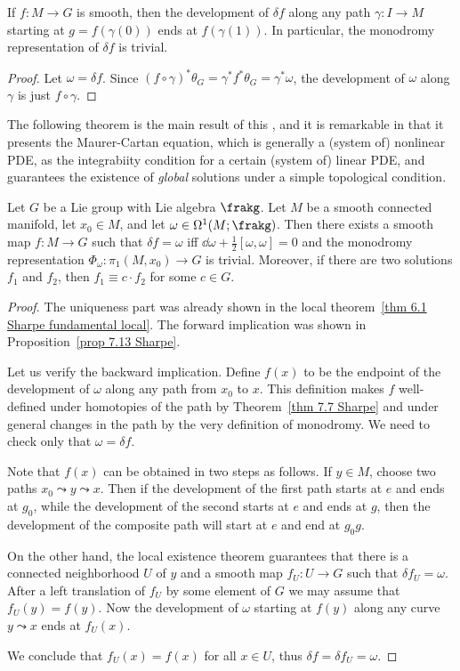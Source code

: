 \begin{prop}\label{prop 7.13 Sharpe}
    If $f:M\to G$ is smooth, then the development of $\delta f$ along any path $\gamma:I\to M$ starting at $g=f(\gamma(0))$ ends at $f(\gamma(1))$. In particular, the monodromy representation of $\delta f$ is trivial.
\end{prop}
\begin{proof}
    Let $\omega=\delta f$. Since $(f\circ \gamma)^\ast \theta_G=\gamma^\ast f^\ast\theta_G=\gamma^\ast\omega$, the development of $\omega$ along $\gamma$ is just $f\circ\gamma$.
\end{proof}

The following theorem is the main result of this \sect, and it is remarkable in that it presents the Maurer-Cartan equation, which is generally a (system of) nonlinear PDE, as the integrabiity condition for a certain (system of) linear PDE, and guarantees the existence of \emph{global} solutions under a simple topological condition.

\begin{thm}\label{thm 7.14 Sharpe fundamental global}
    Let $G$ be a Lie group with Lie algebra $\frakg$. Let $M$ be a smooth connected manifold, let $x_0\in M$, and let $\omega \in\Omega^1(M;\frakg)$. Then there exists a smooth map $f:M\to G$ such that $\delta f=\omega$ iff $\dd\omega+\frac12[\omega,\omega]=0$ and the monodromy representation $\Phi_\omega:\pi_1(M,x_0)\to G$ is trivial. Moreover, if there are two solutions $f_1$ and $f_2$, then $f_1\equiv c\cdot f_2$ for some $c\in G$.
\end{thm}
\begin{proof}
    The uniqueness part was already shown in the local theorem~\ref{thm 6.1 Sharpe fundamental local}. The forward implication  was shown in Proposition~\ref{prop 7.13 Sharpe}.

    Let us verify the backward implication. Define $f(x)$ to be the endpoint of the development of $\omega$ along any path from $x_0$ to $x$. This definition makes $f$ well-defined under homotopies of the path by Theorem~\ref{thm 7.7 Sharpe} and under general changes in the path by the very definition of monodromy. We need to check only that $\omega=\delta f$.

    Note that $f(x)$ can be obtained in two steps as follows. If $y\in M$, choose two paths $x_0\leadsto y\leadsto x$. Then if the development of the first path starts at $e$ and ends at $g_0$, while the development of the second starts at $e$ and ends at $g$, then the development of the composite path will start at $e$ and end at $g_0g$. 
    
    On the other hand, the local existence theorem guarantees that there is a connected neighborhood $U$ of $y$ and a smooth map $f_U:U\to G$ such that $\delta f_U=\omega$. After a left translation of $f_U$ by some element of $G$ we may assume that $f_U(y)=f(y)$. Now the development of $\omega$ starting at $f(y)$ along any curve $y\leadsto x$ ends at $f_U(x)$. 
    
    We conclude that $f_U(x)=f(x)$ for all $x\in U$, thus $\delta f=\delta f_U=\omega$.
\end{proof}

